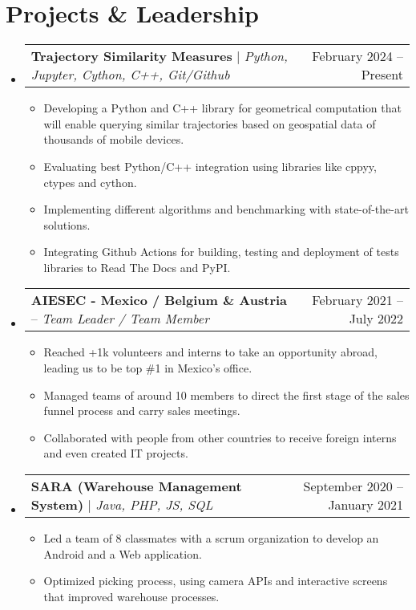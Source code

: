 \documentclass[letterpaper,11pt]{article}
\makeatletter
\newcommand{\resumeItem}[1]{
  \item\small{
    {#1 \vspace{-2pt}}
  }
}
\newcommand{\resumeProjectHeading}[2]{
    \item
    \begin{tabular*}{0.97\textwidth}{l@{\extracolsep{\fill}}r}
      \small#1 & #2 \\
    \end{tabular*}\vspace{-7pt}
}
\newcommand{\resumeSubHeadingListStart}{\begin{itemize}[leftmargin=0.15in, label={}]}
\newcommand{\resumeSubHeadingListEnd}{\end{itemize}}
\newcommand{\resumeItemListStart}{\begin{itemize}}
\newcommand{\resumeItemListEnd}{\end{itemize}\vspace{-5pt}}
\makeatother
\begin{document}
\section{Projects \& Leadership}
    \resumeSubHeadingListStart
      \resumeProjectHeading
          {\textbf{Trajectory Similarity Measures} $|$
          \emph{Python, Jupyter, Cython, C++, Git/Github}}
          {February 2024 -- Present}
          \resumeItemListStart
            \resumeItem{Developing a Python and C++ library for geometrical computation that will enable querying
            similar trajectories based on geospatial data of thousands of mobile devices.}
            \resumeItem{Evaluating best Python/C++ integration using libraries like cppyy, ctypes and cython.}
            \resumeItem{Implementing different algorithms and benchmarking with state-of-the-art solutions.}
            \resumeItem{Integrating Github Actions for building, testing and deployment of tests libraries to Read The
            Docs and PyPI.}
          \resumeItemListEnd
      \resumeProjectHeading
          {\textbf{AIESEC - Mexico / Belgium \& Austria} --
          \emph{Team Leader / Team Member}}{February 2021 -- July 2022}
          \resumeItemListStart
            \resumeItem{Reached +1k volunteers and interns to take an opportunity abroad, leading us to be top \#1 in
            Mexico’s office.}
            \resumeItem{Managed teams of around 10 members to direct the first stage of the sales funnel process and
            carry sales meetings.}
            \resumeItem{Collaborated with people from other countries to receive foreign interns and even created IT
            projects.}
          \resumeItemListEnd
      \resumeProjectHeading
          {\textbf{SARA (Warehouse Management System)} $|$
          \emph{Java, PHP, JS, SQL}}
          {September 2020 -- January 2021}
          \resumeItemListStart
            \resumeItem{Led a team of 8 classmates with a scrum organization to develop an Android and a Web
            application.}
            \resumeItem{Optimized picking process, using camera APIs and interactive screens that improved warehouse
            processes.}
          \resumeItemListEnd
    \resumeSubHeadingListEnd




\end{document}
